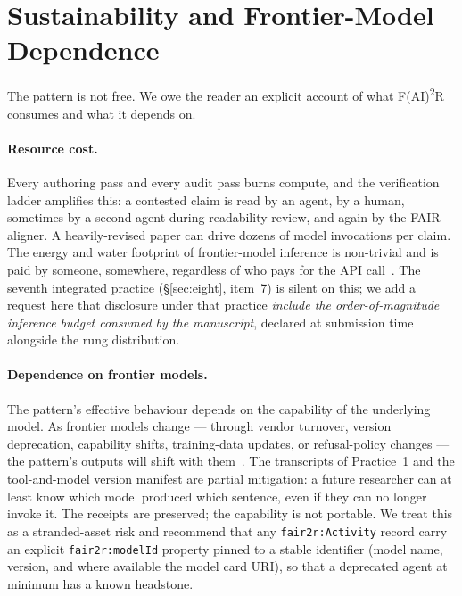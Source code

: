 \section{Sustainability and Frontier-Model Dependence}
\label{sec:sustainability}

The pattern is not free. We owe the reader an explicit account of
what F(AI)\textsuperscript{2}R consumes and what it depends on.

\paragraph{Resource cost.}
Every authoring pass and every audit pass burns compute, and the
verification ladder amplifies this: a contested claim is read by an
agent, by a human, sometimes by a second agent during readability
review, and again by the FAIR aligner. A heavily-revised paper can
drive dozens of model invocations per claim. The energy and water
footprint of frontier-model inference is non-trivial and is paid by
someone, somewhere, regardless of who pays for the API
call~\cite{strubell2019energy,patterson2021carbon,luccioni2024power,li2023thirsty}.
The
seventh integrated practice (\S\ref{sec:eight}, item~7) is silent on
this; we add a request here that disclosure under that practice
\emph{include the order-of-magnitude inference budget consumed by the
manuscript}, declared at submission time alongside the rung
distribution.

\paragraph{Dependence on frontier models.}
The pattern's effective behaviour depends on the capability of the
underlying model. As frontier models change --- through vendor
turnover, version deprecation, capability shifts, training-data
updates, or refusal-policy changes --- the pattern's outputs will
shift with them~\cite{chen2023drift}. The transcripts of Practice~1 and the
tool-and-model version manifest are partial mitigation: a future
researcher can at least know which model produced which sentence,
even if they can no longer invoke it. The receipts are preserved;
the capability is not portable. We treat this as a stranded-asset
risk and recommend that any \texttt{fair2r:Activity} record carry an
explicit \texttt{fair2r:modelId} property pinned to a stable
identifier (model name, version, and where available the model card
URI), so that a deprecated agent at minimum has a known headstone.

